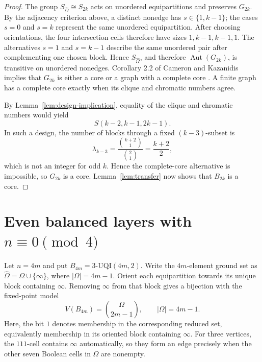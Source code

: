 \documentclass[11pt]{article}
\DeclareMathOperator{\Aut}{Aut}
\begin{document}
\begin{proof}
The group \(S_{\widehat\Omega}\cong S_{2k}\) acts on unordered
equipartitions and preserves \(G_{2k}\).  By the adjacency criterion above,
a distinct nonedge has
\(s\in\{1,k-1\}\); the cases \(s=0\) and \(s=k\) represent the same unordered
equipartition.  After choosing orientations, the four intersection cells
therefore have sizes
\(1,k-1,k-1,1\).  The alternatives \(s=1\) and \(s=k-1\) describe the same
unordered pair after complementing one chosen block.  Hence
\(S_{\widehat\Omega}\), and
therefore \(\Aut(G_{2k})\), is transitive on unordered nonedges.
Corollary 2.2 of Cameron and Kazanidis implies that \(G_{2k}\) is either a
core or a graph with a complete core \cite{CameronKazanidis2008}.  A finite
graph has a complete core exactly when its clique and chromatic numbers agree.

By Lemma~\ref{lem:design-implication}, equality of the clique and chromatic
numbers would yield
\[
S(k-2,k-1,2k-1).
\]
In such a design, the number of blocks through a fixed \((k-3)\)-subset is
\[
\lambda_{k-3}
=\frac{\binom{k+2}{1}}{\binom21}
=\frac{k+2}{2},
\]
which is not an integer for odd \(k\).  Hence the complete-core alternative
is impossible, so \(G_{2k}\) is a core.  Lemma~\ref{lem:transfer} now shows
that \(B_{2k}\) is a core.
\end{proof}

\section{Even balanced layers with
\texorpdfstring{\(n\equiv0\pmod4\)}{n congruent to 0 modulo 4}}

Let \(n=4m\) and put \(B_{4m}=3\text{-}\mathrm{UQI}(4m,2)\).  Write the
\(4m\)-element ground set as
\(\widehat\Omega=\Omega\cup\{\infty\}\), where \(|\Omega|=4m-1\).  Orient
each equipartition towards its unique block containing \(\infty\).
Removing \(\infty\) from that block gives a bijection with the fixed-point
model
\[
V(B_{4m})=\binom{\Omega}{2m-1},
\qquad |\Omega|=4m-1.
\]
Here, the bit \(1\) denotes membership in the corresponding reduced set,
equivalently membership in its oriented block containing \(\infty\).
For three vertices, the \(111\)-cell contains \(\infty\) automatically, so
they form an edge precisely when the other seven Boolean cells in \(\Omega\)
are nonempty.
\end{document}
